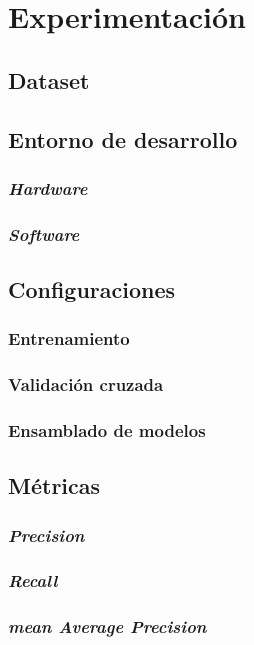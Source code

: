 \documentclass[12pt,a4paper,onecolumn,oneside]{report}
\begin{document}
\chapter{Experimentación}
\label{Experimentación}

\section{Dataset}


\section{Entorno de desarrollo}
\subsection{\textit{Hardware}}
\subsection{\textit{Software}}

\section{Configuraciones}
\subsection{Entrenamiento}
\subsection{Validación cruzada}
\subsection{Ensamblado de modelos}

\section{Métricas}
\subsection{\textit{Precision}}
\subsection{\textit{Recall}}
\subsection{\textit{mean Average Precision}}
\end{document}
